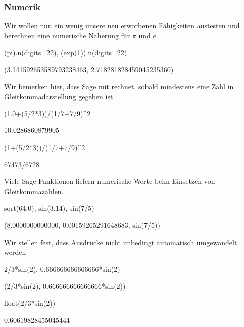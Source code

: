 \documentclass[fontsize=12pt,paper=a4,twoside,bibtotoc,idxtotoc,
liststotoc,pagesize,BCOR1.2cm,DIV15,chapterprefix,pagesize=pdftex]{scrbook}
\theoremstyle{plain}
\theoremstyle{definition}
\theoremstyle{remark}
\begin{document}
\subsubsection{Numerik}
Wir wollen nun ein wenig unsere neu erworbenen Fähigkeiten austesten und berechnen eine numerische Näherung für $\pi$ und $e$
\begin{sagein}
(pi).n(digits=22), (exp(1)).n(digits=22)
\end{sagein}
\begin{sageout}
(3.141592653589793238463, 2.718281828459045235360)
\end{sageout}
Wir bemerken hier, dass Sage mit  rechnet, sobald mindestens eine Zahl in
Gleitkommadarstellung gegeben ist 
\begin{sagein}
(1.0+(5/2*3))/(1/7+7/9)^2
\end{sagein}
\begin{sageout}
10.0286860879905
\end{sageout}
\begin{sagein}
(1+(5/2*3))/(1/7+7/9)^2
\end{sagein}
\begin{sageout}
67473/6728
\end{sageout}
Viele Sage Funktionen liefern numerische Werte beim Einsetzen
     von Gleitkommazahlen.
\begin{sagein}
sqrt(64.0), sin(3.14), sin(7/5)
\end{sagein}
\begin{sageout}
(8.0000000000000, 0.00159265291648683, sin(7/5))
\end{sageout}
Wir stellen fest, dass Ausdrücke nicht unbedingt automatisch umgewandelt werden
\begin{sagein}
2/3*sin(2), 0.666666666666666*sin(2)
\end{sagein}
\begin{sageout}
(2/3*sin(2), 0.666666666666666*sin(2))
\end{sageout}
\begin{sagein}
float(2/3*sin(2))
\end{sagein}
\begin{sageout}
0.60619828455045444
\end{sageout}
\end{document}
